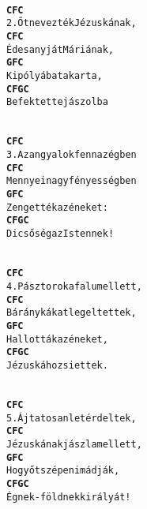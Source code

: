 \begin{minipage}{\textwidth}
\kottastart
{}
\kottaend
\begin{minipage}{\textwidth}
\begin{multicols}{2}
\begin{minipage}{\textwidth}
\begin{alltt}
\textbf{   }
\textbf{   C            F      C}
2. Őt nevezték Jézuskának,
\textbf{   C           F    C}
   Édesanyját Máriának,
\textbf{   G           F    C}
   Ki pólyába takarta,
\textbf{   C           F  G C}
   Befektette jászolba
\end{alltt}
\vspace{0.0cm}
\versszakspacing
\end{minipage}
\begin{minipage}{\textwidth}
\begin{alltt}
\textbf{   }
\textbf{   C            F         C}
3. Az angyalok fenn az égben
\textbf{   C             F        C}
   Mennyei nagy fényességben
\textbf{   G            F   C}
   Zengették az éneket:
\textbf{   C           F  G  C}
   Dicsőség az Istennek!
\end{alltt}
\vspace{0.0cm}
\versszakspacing
\end{minipage}
\begin{minipage}{\textwidth}
\begin{alltt}
\textbf{   }
\textbf{   C            F       C}
4. Pásztorok a falu mellett,
\textbf{   C            F       C}
   Báránykákat legeltettek,
\textbf{   G            F   C}
   Hallották az éneket,
\textbf{   C           F G C}
   Jézuskához siettek.
\end{alltt}
\vspace{0.0cm}
\versszakspacing
\end{minipage}
\begin{minipage}{\textwidth}
\begin{alltt}
\textbf{   }
\textbf{   C          F       C}
5. Ájtatosan letérdeltek,
\textbf{   C           F         C}
   Jézuskának jászla mellett,
\textbf{   G              F    C}
   Hogy őt szépen imádják,
\textbf{   C              F G  C}
   Égnek-földnek királyát!
\end{alltt}
\vspace{0.0cm}
\versszakspacing
\end{minipage}
\vspace{0.2cm}
\end{multicols}
\end{minipage}

\end{minipage}
~\vspace{1.0cm}
\newline
